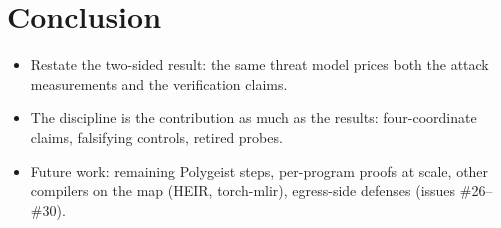 \section{Conclusion}


\begin{itemize}
  \item Restate the two-sided result: the same threat model prices both the
    attack measurements and the verification claims.
  \item The discipline is the contribution as much as the results:
    four-coordinate claims, falsifying controls, retired probes.
  \item Future work: remaining Polygeist steps, per-program proofs at scale,
    other compilers on the map (HEIR, torch-mlir), egress-side defenses
    (issues \#26--\#30).
\end{itemize}

